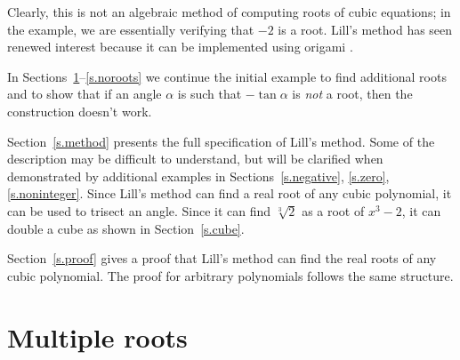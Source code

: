 Clearly, this is not an algebraic method of computing roots of cubic equations; in the example, we are essentially verifying that $-2$ is a root. Lill's method has seen renewed interest because it can be implemented using origami \cite{hull-beloch}.

In Sections~\ref{s.multiple}--\ref{s.noroots} we continue the initial example to find additional roots and to show that if an angle $\alpha$ is such that $-\tan\alpha$ is \emph{not} a root, then the construction doesn't work.

Section~\ref{s.method} presents the full specification of Lill's method. Some of the description may be difficult to understand, but will be clarified when demonstrated by additional examples in Sections~\ref{s.negative}, \ref{s.zero}, \ref{s.noninteger}. Since Lill's method can find a real root of any cubic polynomial, it can be used to trisect an angle. Since it can find $\sqrt[3]{2}$ as a root of $x^3-2$, it can double a cube as shown in Section~\ref{s.cube}.

Section~\ref{s.proof} gives a proof that Lill's method can find the real roots of any cubic polynomial. The proof for arbitrary polynomials follows the same structure.

\newpage

\section{Multiple roots}\label{s.multiple}

